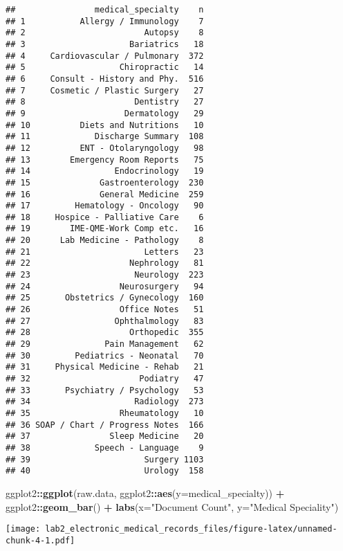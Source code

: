 \documentclass[
]{article}
\newenvironment{Shaded}{\begin{snugshade}}{\end{snugshade}}
\newcommand{\AttributeTok}[1]{\textcolor[rgb]{0.13,0.29,0.53}{#1}}
\newcommand{\FunctionTok}[1]{\textcolor[rgb]{0.13,0.29,0.53}{\textbf{#1}}}
\newcommand{\NormalTok}[1]{#1}
\newcommand{\SpecialCharTok}[1]{\textcolor[rgb]{0.81,0.36,0.00}{\textbf{#1}}}
\newcommand{\StringTok}[1]{\textcolor[rgb]{0.31,0.60,0.02}{#1}}
\begin{document}
\begin{verbatim}
##                medical_specialty    n
## 1           Allergy / Immunology    7
## 2                        Autopsy    8
## 3                     Bariatrics   18
## 4     Cardiovascular / Pulmonary  372
## 5                   Chiropractic   14
## 6     Consult - History and Phy.  516
## 7     Cosmetic / Plastic Surgery   27
## 8                      Dentistry   27
## 9                    Dermatology   29
## 10          Diets and Nutritions   10
## 11             Discharge Summary  108
## 12          ENT - Otolaryngology   98
## 13        Emergency Room Reports   75
## 14                 Endocrinology   19
## 15              Gastroenterology  230
## 16              General Medicine  259
## 17         Hematology - Oncology   90
## 18     Hospice - Palliative Care    6
## 19        IME-QME-Work Comp etc.   16
## 20      Lab Medicine - Pathology    8
## 21                       Letters   23
## 22                    Nephrology   81
## 23                     Neurology  223
## 24                  Neurosurgery   94
## 25       Obstetrics / Gynecology  160
## 26                  Office Notes   51
## 27                 Ophthalmology   83
## 28                    Orthopedic  355
## 29               Pain Management   62
## 30         Pediatrics - Neonatal   70
## 31     Physical Medicine - Rehab   21
## 32                      Podiatry   47
## 33       Psychiatry / Psychology   53
## 34                     Radiology  273
## 35                  Rheumatology   10
## 36 SOAP / Chart / Progress Notes  166
## 37                Sleep Medicine   20
## 38             Speech - Language    9
## 39                       Surgery 1103
## 40                       Urology  158
\end{verbatim}

\begin{Shaded}
\begin{Highlighting}[]
\NormalTok{ggplot2}\SpecialCharTok{::}\FunctionTok{ggplot}\NormalTok{(raw.data, ggplot2}\SpecialCharTok{::}\FunctionTok{aes}\NormalTok{(}\AttributeTok{y=}\NormalTok{medical\_specialty)) }\SpecialCharTok{+}\NormalTok{ ggplot2}\SpecialCharTok{::}\FunctionTok{geom\_bar}\NormalTok{() }\SpecialCharTok{+} \FunctionTok{labs}\NormalTok{(}\AttributeTok{x=}\StringTok{"Document Count"}\NormalTok{, }\AttributeTok{y=}\StringTok{"Medical Speciality"}\NormalTok{)}
\end{Highlighting}
\end{Shaded}

\texttt{[image: lab2\_electronic\_medical\_records\_files/figure-latex/unnamed-chunk-4-1.pdf]}
\end{document}
